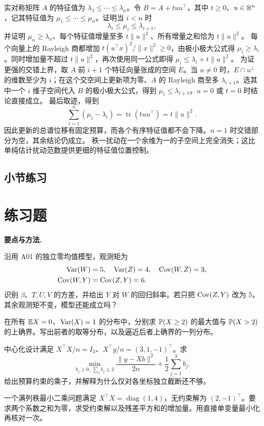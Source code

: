实对称矩阵 $A$ 的特征值为 $\lambda_1\le\cdots\le\lambda_n$。令 $B=A+tuu^\top$，其中 $t\ge0$、$u\in\mathbb{R}^n$，记其特征值为 $\mu_1\le\cdots\le\mu_n$。证明当 $i<n$ 时
\[
 \lambda_i\le\mu_i\le\lambda_{i+1},
\]
并证明 $\mu_n\ge\lambda_n$、每个特征值增量至多 $t\|u\|^2$、所有增量之和恰为 $t\|u\|^2$。
\solution 每个向量上的 Rayleigh 商都增加 $t(u^\top x)^2/\|x\|^2\ge0$，由极小极大公式得 $\mu_i\ge\lambda_i$。同时增加量不超过 $t\|u\|^2$，再次使用同一公式即得 $\mu_i\le\lambda_i+t\|u\|^2$。
为证更强的交错上界，取 $A$ 前 $i+1$ 个特征向量张成的空间 $E$。当 $u\ne0$ 时，$E\cap u^\perp$ 的维数至少为 $i$；在这个交空间上更新项为零、$A$ 的 Rayleigh 商至多 $\lambda_{i+1}$。选其中一个 $i$ 维子空间代入 $B$ 的极小极大公式，得到 $\mu_i\le\lambda_{i+1}$。$u=0$ 或 $t=0$ 时结论直接成立。
最后取迹，得到
\[
 \sum_{i=1}^n(\mu_i-\lambda_i)
 =\operatorname{tr}(tuu^\top)=t\|u\|^2.
\]
因此更新的总谱位移有固定预算，而各个有序特征值都不会下降。$n=1$ 时交错部分为空，其余结论仍成立。
\insight 秩一扰动在一个余维为一的子空间上完全消失；这比单纯估计扰动范数提供更细的特征值位置控制。



\par{}
\subsection*{小节练习}


\section{练习题}
\noindent\textbf{要点与方法.}\enspace



\pagebreak
{}
沿用 A01 的独立零均值模型，观测矩为
\[
 \begin{aligned}
 \operatorname{Var}(W)&=5,\quad\operatorname{Var}(Z)=4,\quad\operatorname{Cov}(W,Z)=3,\\
 \operatorname{Cov}(W,Y)&=\operatorname{Cov}(Z,Y)=6.
 \end{aligned}
\]
识别 $\beta$、$T,U,V$ 的方差，并给出 $Y$ 对 $W$ 的回归斜率。若只把 $\operatorname{Cov}(Z,Y)$ 改为 $5$，其余观测矩不变，模型还能成立吗？

在所有 $\mathbb{E} X=0$、$\operatorname{Var}(X)=1$ 的分布中，分别求 $\mathbb{P}(X\ge2)$ 的最大值与 $\mathbb{P}(X>2)$ 的上确界。写出前者的取等分布，以及逼近后者上确界的一列分布。

中心化设计满足 $X^\top X/n=I_3$、$X^\top y/n=(3,1,-1)^\top$。求
\[
 \min_{b_j\ge0,\ \sum_jb_j\le2}
 \frac{\|y-Xb\|^2}{2n}+\frac12\sum_{j=1}^3b_j.
\]
给出预算约束的乘子，并解释为什么仅对各坐标独立截断还不够。

一个满列秩最小二乘问题满足 $X^\top X=\operatorname{diag}(1,4)$，无约束解为 $(2,-1)^\top$。要求两个系数之和为零，求受约束解以及残差平方和的增加量。用直接单变量最小化再核对一次。
